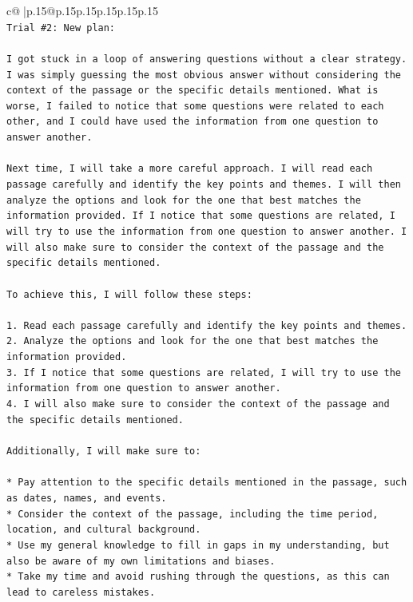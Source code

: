 \documentclass{article}
\begin{document}
{\begin{supertabular}{c@{$\;$}|p{.15\linewidth}@{}p{.15\linewidth}p{.15\linewidth}p{.15\linewidth}p{.15\linewidth}p{.15\linewidth}}
{{{\\ 
\texttt{Trial \#2: New plan: } \\
\\ 
\texttt{I got stuck in a loop of answering questions without a clear strategy. I was simply guessing the most obvious answer without considering the context of the passage or the specific details mentioned. What is worse, I failed to notice that some questions were related to each other, and I could have used the information from one question to answer another.} \\
\\ 
\texttt{Next time, I will take a more careful approach. I will read each passage carefully and identify the key points and themes. I will then analyze the options and look for the one that best matches the information provided. If I notice that some questions are related, I will try to use the information from one question to answer another. I will also make sure to consider the context of the passage and the specific details mentioned.} \\
\\ 
\texttt{To achieve this, I will follow these steps:} \\
\\ 
\texttt{1. Read each passage carefully and identify the key points and themes.} \\
\texttt{2. Analyze the options and look for the one that best matches the information provided.} \\
\texttt{3. If I notice that some questions are related, I will try to use the information from one question to answer another.} \\
\texttt{4. I will also make sure to consider the context of the passage and the specific details mentioned.} \\
\\ 
\texttt{Additionally, I will make sure to:} \\
\\ 
\texttt{* Pay attention to the specific details mentioned in the passage, such as dates, names, and events.} \\
\texttt{* Consider the context of the passage, including the time period, location, and cultural background.} \\
\texttt{* Use my general knowledge to fill in gaps in my understanding, but also be aware of my own limitations and biases.} \\
\texttt{* Take my time and avoid rushing through the questions, as this can lead to careless mistakes.} \\
}}}
\end{supertabular}}
\end{document}
